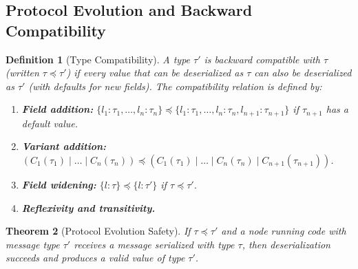\documentclass[11pt,a4paper]{article}
\newtheorem{theorem}{Theorem}[section]
\newtheorem{definition}[theorem]{Definition}
\begin{document}
\subsection{Protocol Evolution and Backward Compatibility}

\begin{definition}[Type Compatibility]
A type $\tau'$ is \emph{backward compatible} with $\tau$ (written
$\tau \preceq \tau'$) if every value that can be deserialized as $\tau$
can also be deserialized as $\tau'$ (with defaults for new fields). The
compatibility relation is defined by:
\begin{enumerate}[nosep]
  \item \textbf{Field addition:} $\{l_1:\tau_1, \ldots, l_n:\tau_n\}
        \preceq \{l_1:\tau_1, \ldots, l_n:\tau_n, l_{n+1}:\tau_{n+1}\}$
        if $\tau_{n+1}$ has a default value.
  \item \textbf{Variant addition:} $(C_1(\tau_1) \mid \ldots \mid C_n(\tau_n))
        \preceq (C_1(\tau_1) \mid \ldots \mid C_n(\tau_n) \mid C_{n+1}(\tau_{n+1}))$.
  \item \textbf{Field widening:} $\{l:\tau\} \preceq \{l:\tau'\}$ if
        $\tau \preceq \tau'$.
  \item \textbf{Reflexivity and transitivity.}
\end{enumerate}
\end{definition}

\begin{theorem}[Protocol Evolution Safety]
\label{thm:evolution}
If $\tau \preceq \tau'$ and a node running code with message type $\tau'$
receives a message serialized with type $\tau$, then deserialization
succeeds and produces a valid value of type $\tau'$.
\end{theorem}
\end{document}

